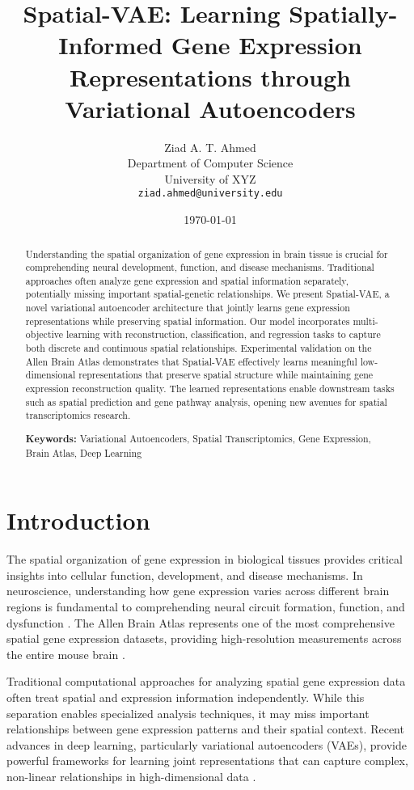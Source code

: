 \documentclass[11pt]{article}
\title{Spatial-VAE: Learning Spatially-Informed Gene Expression Representations through Variational Autoencoders}
\author{
Ziad A. T. Ahmed\\
Department of Computer Science\\
University of XYZ\\
\texttt{ziad.ahmed@university.edu}
}
\date{\today}
\begin{document}
\maketitle

\begin{abstract}
Understanding the spatial organization of gene expression in brain tissue is crucial for comprehending neural development, function, and disease mechanisms. Traditional approaches often analyze gene expression and spatial information separately, potentially missing important spatial-genetic relationships. We present Spatial-VAE, a novel variational autoencoder architecture that jointly learns gene expression representations while preserving spatial information. Our model incorporates multi-objective learning with reconstruction, classification, and regression tasks to capture both discrete and continuous spatial relationships. Experimental validation on the Allen Brain Atlas demonstrates that Spatial-VAE effectively learns meaningful low-dimensional representations that preserve spatial structure while maintaining gene expression reconstruction quality. The learned representations enable downstream tasks such as spatial prediction and gene pathway analysis, opening new avenues for spatial transcriptomics research.

\textbf{Keywords:} Variational Autoencoders, Spatial Transcriptomics, Gene Expression, Brain Atlas, Deep Learning
\end{abstract}

\section{Introduction}

The spatial organization of gene expression in biological tissues provides critical insights into cellular function, development, and disease mechanisms. In neuroscience, understanding how gene expression varies across different brain regions is fundamental to comprehending neural circuit formation, function, and dysfunction \cite{lein2007genome}. The Allen Brain Atlas represents one of the most comprehensive spatial gene expression datasets, providing high-resolution measurements across the entire mouse brain \cite{hawrylycz2012atlas}.

Traditional computational approaches for analyzing spatial gene expression data often treat spatial and expression information independently. While this separation enables specialized analysis techniques, it may miss important relationships between gene expression patterns and their spatial context. Recent advances in deep learning, particularly variational autoencoders (VAEs), provide powerful frameworks for learning joint representations that can capture complex, non-linear relationships in high-dimensional data \cite{kingma2013auto}.
\end{document}
